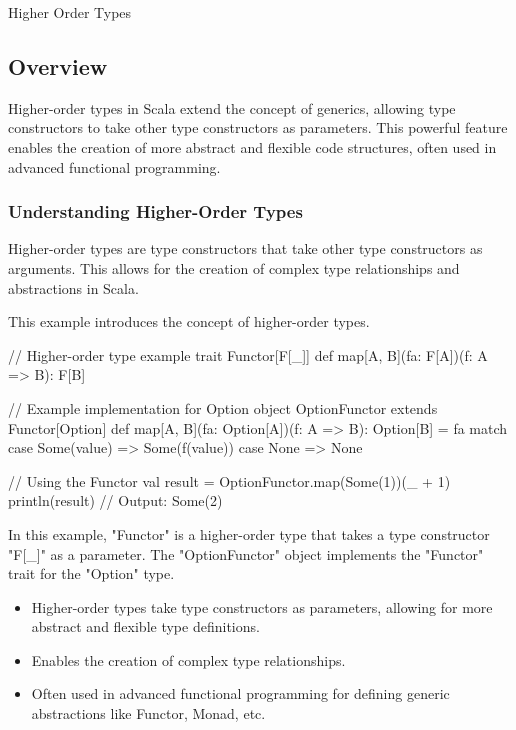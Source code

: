 \begin{notes}{Higher Order Types}
    \subsection*{Overview}

    Higher-order types in Scala extend the concept of generics, allowing type constructors to take other type constructors as parameters. This powerful feature enables the creation of more abstract 
    and flexible code structures, often used in advanced functional programming.
    
    \subsubsection*{Understanding Higher-Order Types}
    
    Higher-order types are type constructors that take other type constructors as arguments. This allows for the creation of complex type relationships and abstractions in Scala.
    
    \begin{highlight}
    
        This example introduces the concept of higher-order types.
    
    \begin{code}[Scala]
    // Higher-order type example
    trait Functor[F[_]] {
        def map[A, B](fa: F[A])(f: A => B): F[B]
    }
    
    // Example implementation for Option
    object OptionFunctor extends Functor[Option] {
        def map[A, B](fa: Option[A])(f: A => B): Option[B] = fa match {
            case Some(value) => Some(f(value))
            case None => None
        }
    }
    
    // Using the Functor
    val result = OptionFunctor.map(Some(1))(_ + 1)
    println(result)  // Output: Some(2)
    \end{code}
    
        In this example, "Functor" is a higher-order type that takes a type constructor "F[\_]" as a parameter. The "OptionFunctor" object implements the "Functor" trait for the "Option" type.
    
        \begin{itemize}
            \item Higher-order types take type constructors as parameters, allowing for more abstract and flexible type definitions.
            \item Enables the creation of complex type relationships.
            \item Often used in advanced functional programming for defining generic abstractions like Functor, Monad, etc.
        \end{itemize}
    

\end{highlight}
\end{notes}
